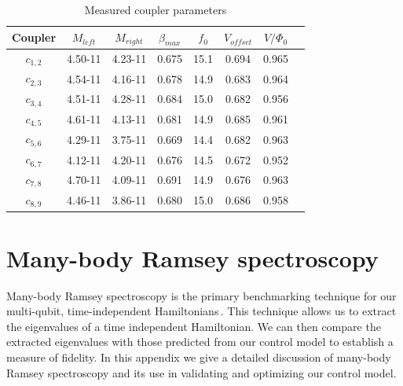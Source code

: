 \begin{table}
    \caption{Measured coupler parameters}
    \centering
    \begin{tabular}{ c c c c c c c c}
        \hline \hline
        Coupler & $M_{left}$ & $M_{right}$ & $\beta_{max}$ & $f_{0}$ & $V_{offset}$ & $V / \Phi_{0}$ \\ %
        \hline
$c_{1,2}$ & 4.50-11 & 4.23-11 & 0.675 & 15.1 & 0.694 & 0.965\\ %
$c_{2,3}$ & 4.54-11 & 4.16-11  & 0.678 & 14.9 & 0.683 & 0.964\\ %
$c_{3,4}$ & 4.51-11  & 4.28-11 & 0.684 & 15.0 & 0.682 & 0.956\\ %
$c_{4,5}$ & 4.61-11  & 4.13-11  & 0.681 & 14.9 & 0.685 & 0.961\\ %
$c_{5,6}$ & 4.29-11  & 3.75-11 & 0.669 & 14.4 & 0.682 & 0.963\\ %
$c_{6,7}$ & 4.12-11 & 4.20-11 & 0.676 & 14.5 & 0.672 & 0.952\\ %
$c_{7,8}$ & 4.70-11 & 4.09-11 & 0.691 & 14.9 & 0.676 & 0.963\\ %
$c_{8,9}$ & 4.46-11 & 3.86-11 & 0.680 & 15.0 & 0.686 & 0.958\\ %
        \hline
    \end{tabular}
    \label{table:Coupler Parameters}
\end{table}

\section{Many-body Ramsey spectroscopy}
\label{sec:mbr}

Many-body Ramsey spectroscopy is the primary benchmarking technique for our multi-qubit, time-independent Hamiltonians\,\cite{Roushan2018}.
This technique allows us to extract the eigenvalues of a time independent Hamiltonian.
We can then compare the extracted eigenvalues with those predicted from our control model to establish a measure of fidelity.
In this appendix we give a detailed discussion of many-body Ramsey spectroscopy and its use in validating and optimizing our control model.

